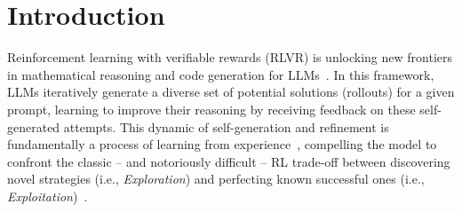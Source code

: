 \documentclass{article} %
\begin{document}
\section{Introduction}
Reinforcement learning with verifiable rewards (RLVR) is unlocking new frontiers in mathematical reasoning and code generation for LLMs~\citep{openai2024learning, guo2025deepseek, team2025kimi}. 
%
In this framework, LLMs iteratively generate a diverse set of potential solutions (rollouts) for a given prompt, learning to improve their reasoning by receiving feedback on these self-generated attempts.
%
This dynamic of self-generation and refinement is fundamentally a process of learning from experience~\citep{silver2025welcome}, compelling the model to confront the classic -- and notoriously difficult -- RL trade-off between discovering novel strategies (i.e., \textit{Exploration}) and perfecting known successful ones (i.e., \textit{Exploitation})~\citep{thrun1992efficient, sutton1998reinforcement}.

\end{document}
